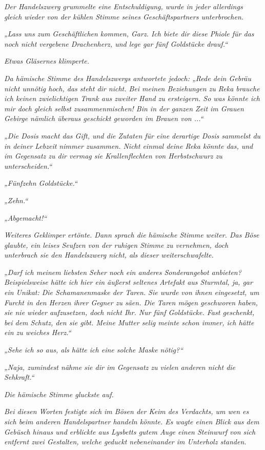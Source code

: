 \textit{Der Handelszwerg grummelte eine Entschuldigung, wurde in jeder allerdings gleich wieder von der kühlen Stimme seines Geschäftspartners unterbrochen.}

\textit{„Lass uns zum Geschäftlichen kommen, Garz. Ich biete dir diese Phiole für das noch nicht vergebene Drachenherz, und lege gar fünf Goldstücke drauf.“}

\textit{Etwas Gläsernes klimperte.}

\textit{Da hämische Stimme des Handelszwergs antwortete jedoch: „Rede dein Gebräu nicht unnötig hoch, das steht dir nicht. Bei meinen Beziehungen zu Reka brauche ich keinen zwielichtigen Trank aus zweiter Hand zu ersteigern. So was könnte ich mir doch gleich selbst zusammenmischen! Bin in der ganzen Zeit im Grauen Gebirge nämlich überaus geschickt geworden im Brauen von ...“}

\textit{„Die Dosis macht das Gift, und die Zutaten für eine derartige Dosis sammelst du in deiner Lebzeit nimmer zusammen. Nicht einmal deine Reka könnte das, und im Gegensatz zu dir vermag sie Krallenflechten von Herbstschwurz zu unterscheiden.“}

\textit{„Fünfzehn Goldstücke.“}

\textit{„Zehn.“}

\textit{„Abgemacht!“}

\textit{Weiteres Geklimper ertönte. Dann sprach die hämische Stimme weiter. Das Böse glaubte, ein leises Seufzen von der ruhigen Stimme zu vernehmen, doch unterbrach sie den Handelszwerg nicht, als dieser weiterschwafelte.}

\textit{„Darf ich meinem liebsten Seher noch ein anderes Sonderangebot anbieten? Beispielsweise hätte ich hier ein äußerst seltenes Artefakt aus Sturmtal, ja, gar ein Unikat: Die Schamanenmaske der Taren. Sie wurde von ihnen eingesetzt, um Furcht in den Herzen ihrer Gegner zu säen. Die Taren mögen geschworen haben, sie nie wieder aufzusetzen, doch nicht Ihr. Nur fünf Goldstücke. Fast geschenkt, bei dem Schutz, den sie gibt. Meine Mutter selig meinte schon immer, ich hätte ein zu weiches Herz.“}

\textit{„Sehe ich so aus, als hätte ich eine solche Maske nötig?“}

\textit{„Naja, zumindest nähme sie dir im Gegensatz zu vielen anderen nicht die Sehkraft.“}

\textit{Die hämische Stimme gluckste auf.}

\textit{Bei diesen Worten festigte sich im Bösen der Keim des Verdachts, um wen es sich beim anderen Handelspartner handeln könnte. Es wagte einen Blick aus dem Gebüsch hinaus und erblickte aus Lysbetts gutem Auge einen Steinwurf von sich entfernt zwei Gestalten, welche geduckt nebeneinander im Unterholz standen.}


